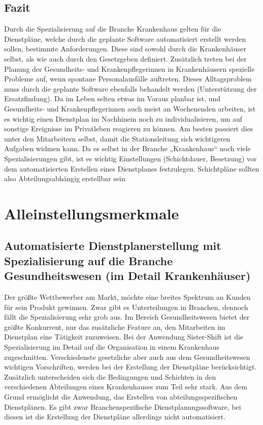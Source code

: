 \documentclass[10pt,a4paper]{article}
\begin{document}
\subsection{Fazit}
Durch die Spezialisierung auf die Branche Krankenhaus gelten für die Dienstpläne, welche durch die geplante Software automatisiert erstellt werden sollen, bestimmte Anforderungen. Diese sind sowohl durch die Krankenhäuser selbst, als wie auch durch den Gesetzgeben definiert. Zusätzlich treten bei der Planung der Gesundheits- und Krankenpflegerinnen in Krankenhäusern spezielle Probleme auf, wenn spontane Personalausfälle auftreten. Dieses Alltagsproblem muss durch die geplante Software ebenfalls behandelt werden (Unterstützung der Ersatzfindung). Da im Leben selten etwas im Voraus planbar ist, und Gesundheits- und Krankenpflegerinnen auch meist an Wochenenden arbeiten, ist es wichtig einen Dienstplan im Nachhinein noch zu individualisieren, um auf sonstige Ereignisse im Privatleben reagieren zu können. Am besten passiert dies unter den Mitarbeitern selbst, damit die Stationsleitung sich wichtigeren Aufgaben widmen kann. Da es selbst in der Branche „Krankenhaus“ noch viele Spezialisierungen gibt, ist es wichtig Einstellungen (Schichtdauer, Besetzung) vor dem automatisierten Erstellen eines Dienstplanes festzulegen. Schichtpläne sollten also Abteilungsabhängig erstellbar sein
\section{Alleinstellungsmerkmale}
\subsection{Automatisierte Dienstplanerstellung mit Spezialisierung auf die Branche Gesundheitswesen (im Detail Krankenhäuser) }
Der größte Wettbewerber am Markt, möchte eine breites Spektrum an Kunden für sein Produkt gewinnen. Zwar gibt es Unterteilungen in Branchen, dennoch fällt die Spezialisierung sehr grob aus. Im Bereich Gesundheitswesen bietet der größte Konkurrent, nur das zusätzliche Feature an, den Mitarbeiten im Dienstplan eine Tätigkeit zuzuweisen. Bei der Anwendung Sister-Shift ist die Spezialisierung im Detail auf die Organisation in einem Krankenhaus zugeschnitten. Verschiedenste gesetzliche aber auch aus dem Gesundheitswesen wichtigen Vorschriften, werden bei der Erstellung der Dienstpläne berücksichtigt. Zusätzlich unterscheiden sich die Bedingungen und Schichten in den verschiedenen Abteilungen eines Krankenhauses zum Teil sehr stark. Aus dem Grund ermöglicht die Anwendung, das Erstellen von abteilungsspezifischen Dienstplänen. Es gibt zwar Branchenspezifische Dienstplanungssoftware, bei diesen ist die Erstellung der Dienstpläne allerdings nicht automatisiert.
\end{document}
